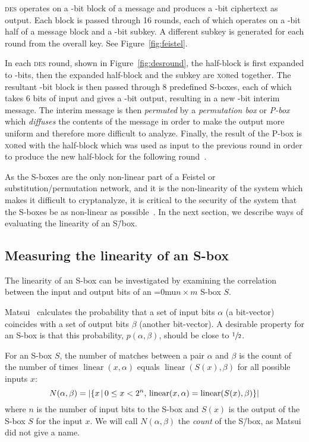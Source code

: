 \documentclass[a4paper,10pt,twoside,openright]{book}
\renewcommand{\sc}[1]{\textsc{\lowercase{#1}}}
\renewcommand{\ln}[1]{{\fontsize{8pt}{8pt}\selectfont#1}}
\newcommand{\set}[1]{\left\{#1\right\}}
\newcommand{\N}{N(\alpha,\beta)}
\newcommand*\nbym{\begingroup\medmuskip=0mu\relax$n \times m$\endgroup}
\DeclareMathOperator{\lin}{linear}
\DeclarePairedDelimiter\Cardinality{\lvert}{\rvert}%
\begin{document}
\sc{DES} operates on a \ln{64}-bit block of a message and produces a \ln{64}-bit ciphertext as output. Each block is passed through 16 rounds, each of which operates on a \ln{32}-bit half of a message block and a \ln{48}-bit subkey. A different subkey is generated for each round from the overall key. See Figure~\ref{fig:feistel}.

In each \sc{DES} round, shown in Figure~\ref{fig:desround}, the half-block is first expanded to \ln{48}-bits, then the expanded half-block and the subkey are \sc{XOR}ed together. The resultant \ln{48}-bit block is then passed through 8 predefined S-boxes, each of which takes 6 bits of input and gives a \ln{4}-bit output, resulting in a new \ln{32}-bit interim message. The interim message is then \textit{permuted} by a \textit{permutation box} or \textit{P-box} which \textit{diffuses} the contents of the message in order to make the output more uniform and therefore more difficult to analyze. Finally, the result of the P-box is \sc{XOR}ed with the half-block which was used as input to the previous round in order to produce the new half-block for the following round~\cite{biham}.

As the S-boxes are the only non-linear part of a Feistel or substitution\-/permutation network, and it is the non-linearity of the system which makes it difficult to cryptanalyze, it is critical to the security of the system that the S-boxes be as non-linear as possible~\cite{sboxes}. In the next section, we describe ways of evaluating the linearity of an S\=/box.

\subsection{Measuring the linearity of an S-box}

The linearity of an S-box can be investigated by examining the correlation between the input and output bits of an \nbym{} S-box $S$.

Matsui~\cite{matsui} calculates the probability that a set of input bits $\alpha$ (a bit-vector) coincides with a set of output bits $\beta$ (another bit-vector). A desirable property for an S-box is that this probability, $p(\alpha, \beta)$, should be close to $\sfrac{1}{2}$.

For an S-box $S$, the number of matches between a pair $\alpha$ and $\beta$ is the count of the number of times 
$\lin(x,\alpha)$ equals $\lin(S(x),\beta)$ 
for all possible inputs $x$: 
\[\N = \Cardinality{\set{x\,\middle|\,0\leq x < 2^n,\,\lin(x,\alpha) = \lin(S(x),\beta)}}\] 
where $n$ is the number of input bits to the S-box and $S(x)$ is the output of the S-box $S$ for the input $x$. We will call $\N$ the \textit{count} of the S\=/box, as Matsui did not give a name.
\end{document}
